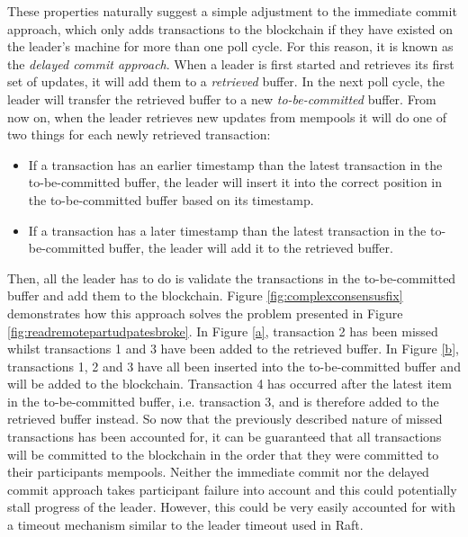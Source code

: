\documentclass[12pt,a4paper,twoside,openright]{report}
\begin{document}
	These properties naturally suggest a simple adjustment to the immediate commit approach, which only adds transactions to the blockchain if they have existed on the leader's machine for more than one poll cycle.
	For this reason, it is known as the \textit{delayed commit approach}.
	When a leader is first started and retrieves its first set of updates, it will add them to a \textit{retrieved} buffer.
	In the next poll cycle, the leader will transfer the retrieved buffer to a new \textit{to-be-committed} buffer.
	From now on, when the leader retrieves new updates from mempools it will do one of two things for each newly retrieved transaction:
	\begin{itemize}
		\item If a transaction has an earlier timestamp than the latest transaction in the to-be-committed buffer, the leader will insert it into the correct position in the to-be-committed buffer based on its timestamp.
		\item If a transaction has a later timestamp than the latest transaction in the to-be-committed buffer, the leader will add it to the retrieved buffer.
	\end{itemize}
	Then, all the leader has to do is validate the transactions in the to-be-committed buffer and add them to the blockchain.
	Figure \ref{fig:complexconsensusfix} demonstrates how this approach solves the problem presented in Figure \ref{fig:readremotepartudpatesbroke}.
	In Figure \ref{a}, transaction 2 has been missed whilst transactions 1 and 3 have been added to the retrieved buffer. 
	In Figure \ref{b}, transactions 1, 2 and 3 have all been inserted into the to-be-committed buffer and will be added to the blockchain.
	Transaction 4 has occurred after the latest item in the to-be-committed buffer, i.e. transaction 3, and is therefore added to the retrieved buffer instead. 
	So now that the previously described nature of missed transactions has been accounted for, it can be guaranteed that all transactions will be committed to the blockchain in the order that they were committed to their participants mempools.
	Neither the immediate commit nor the delayed commit approach takes participant failure into account and this could potentially stall progress of the leader. 
	However, this could be very easily accounted for with a timeout mechanism similar to the leader timeout used in Raft.\\
\end{document}
